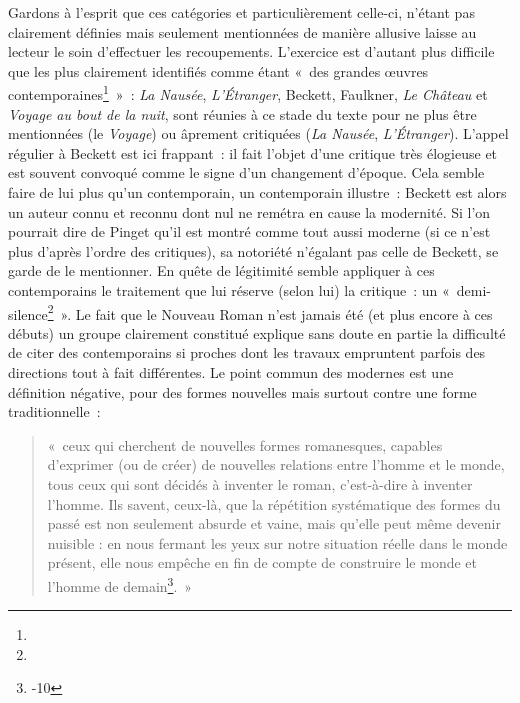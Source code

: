 \documentclass[12pt, a4paper]{article}
\begin{document}
Gardons à l'esprit que ces catégories et particulièrement celle-ci, n'étant pas clairement définies mais seulement mentionnées de manière allusive laisse au lecteur le soin d'effectuer les recoupements. L'exercice est d'autant plus difficile que les plus clairement identifiés comme étant «~des grandes œuvres contemporaines\footnote{}~»~: \textit{La Nausée}, \textit{L'Étranger}, Beckett, Faulkner, \textit{Le Château} et \textit{Voyage au bout de la nuit}, sont réunies à ce stade du texte pour ne plus être mentionnées (le \textit{Voyage}) ou âprement critiquées (\textit{La Nausée}, \textit{L'Étranger}). L'appel régulier à Beckett est ici frappant~: il fait l'objet d'une critique très élogieuse et est souvent convoqué comme le signe d'un changement d'époque. Cela semble faire de lui plus qu'un contemporain, un contemporain illustre~: Beckett est alors un auteur connu et reconnu dont nul ne remétra en cause la modernité. Si l'on pourrait dire de Pinget qu'il est montré comme tout aussi moderne (si ce n'est plus d'après l'ordre des critiques), sa notoriété n'égalant pas celle de Beckett, \robbe{} se garde de le mentionner. En quête de légitimité \robbe{} semble appliquer à ces contemporains le traitement que lui réserve (selon lui) la critique~: un «~demi-silence\footnote{}~». Le fait que le Nouveau Roman n'est jamais été (et plus encore à ces débuts) un groupe clairement constitué explique sans doute en partie la difficulté de citer des contemporains si proches dont les travaux empruntent parfois des directions tout à fait différentes. Le point commun des modernes est une définition négative, pour des formes nouvelles mais surtout contre une forme traditionnelle~:
\begin{quote}
«~ceux qui cherchent de nouvelles formes romanesques, capables d’exprimer (ou de créer) de nouvelles relations entre l’homme et le monde, tous ceux qui sont décidés à inventer le roman, c’est-à-dire à inventer l’homme. Ils savent, ceux-là, que la répétition systématique des formes du passé est non seulement absurde et vaine, mais qu’elle peut même devenir nuisible : en nous fermant les yeux sur notre situation réelle dans le monde présent, elle nous empêche en fin de compte de construire le monde et l’homme de demain\footnote{-10}.~»    
\end{quote}
\end{document}
